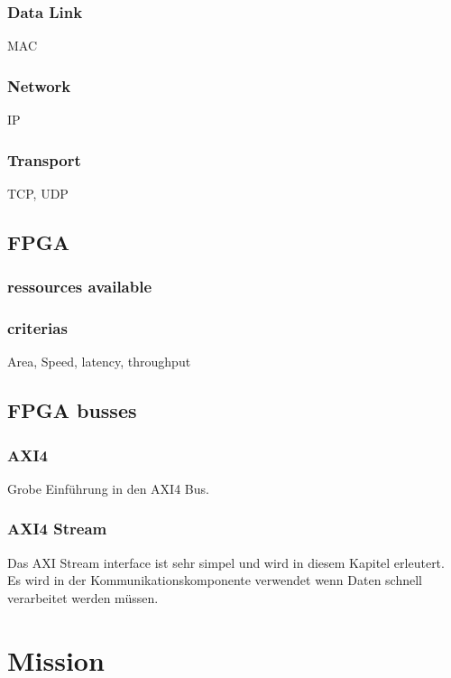 \subsubsection{Data Link} 
MAC
\subsubsection{Network} 
IP
\subsubsection{Transport} 
TCP, UDP        

\subsection{FPGA}
\subsubsection{ressources available}

\subsubsection{criterias}
Area, Speed, latency, throughput


\subsection{FPGA busses}
\subsubsection{AXI4}
Grobe Einführung in den AXI4 Bus.

\subsubsection{AXI4 Stream}
Das AXI Stream interface ist sehr simpel und wird in diesem Kapitel erleutert. 
Es wird in der Kommunikationskomponente verwendet wenn Daten schnell verarbeitet 
werden müssen.
\section{Mission}
